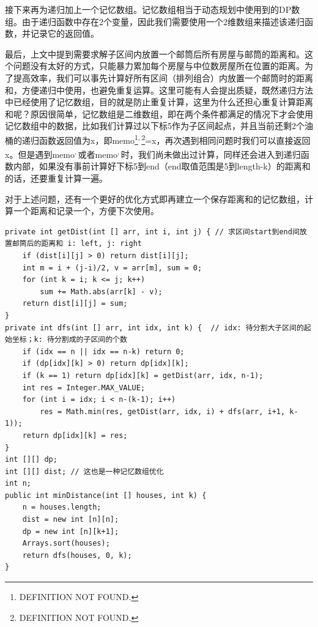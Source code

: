 \documentclass[9pt, b5paaper]{book}
\begin{document}
接下来再为递归加上一个记忆数组。记忆数组相当于动态规划中使用到的DP数组。由于递归函数中存在2个变量，因此我们需要使用一个2维数组来描述该递归函数，并记录它的返回值。

最后，上文中提到需要求解子区间内放置一个邮筒后所有房屋与邮筒的距离和。这个问题没有太好的方式，只能暴力累加每个房屋与中位数房屋所在位置的距离。为了提高效率，我们可以事先计算好所有区间（排列组合）内放置一个邮筒时的距离和，方便递归中使用，也避免重复运算。这里可能有人会提出质疑，既然递归方法中已经使用了记忆数组，目的就是防止重复计算，这里为什么还担心重复计算距离和呢？原因很简单，记忆数组是二维数组，即在两个条件都满足的情况下才会使用记忆数组中的数据，比如我们计算过以下标5作为子区间起点，并且当前还剩2个油桶的递归函数返回值为x，即memo\footnote{DEFINITION NOT FOUND.}\textsuperscript{,}\,\footnote{DEFINITION NOT FOUND.}=x，再次遇到相同问题时我们可以直接返回x。但是遇到memo\footnotemark[4]{}\textsuperscript{,}\,\footnotemark[3]{}或者memo\footnotemark[4]{}\textsuperscript{,}\,\footnotemark[1]{}时，我们尚未做出过计算，同样还会进入到递归函数内部，如果没有事前计算好下标5到end（end取值范围是5到length-k）的距离和的话，还要重复计算一遍。

对于上述问题，还有一个更好的优化方式即再建立一个保存距离和的记忆数组，计算一个距离和记录一个，方便下次使用。

\begin{verbatim}
private int getDist(int [] arr, int i, int j) { // 求区间start到end间放置邮筒后的距离和 i: left, j: right
    if (dist[i][j] > 0) return dist[i][j];
    int m = i + (j-i)/2, v = arr[m], sum = 0;
    for (int k = i; k <= j; k++) 
        sum += Math.abs(arr[k] - v);
    return dist[i][j] = sum;
}
private int dfs(int [] arr, int idx, int k) {  // idx: 待分割大子区间的起始坐标；k: 待分割成的子区间的个数 
    if (idx == n || idx == n-k) return 0;
    if (dp[idx][k] > 0) return dp[idx][k];
    if (k == 1) return dp[idx][k] = getDist(arr, idx, n-1);
    int res = Integer.MAX_VALUE;
    for (int i = idx; i < n-(k-1); i++) 
        res = Math.min(res, getDist(arr, idx, i) + dfs(arr, i+1, k-1));
    return dp[idx][k] = res;
}
int [][] dp;
int [][] dist; // 这也是一种记忆数组优化
int n;
public int minDistance(int [] houses, int k) {
    n = houses.length;
    dist = new int [n][n];
    dp = new int [n][k+1];
    Arrays.sort(houses);
    return dfs(houses, 0, k);
}
\end{verbatim}
\end{document}
